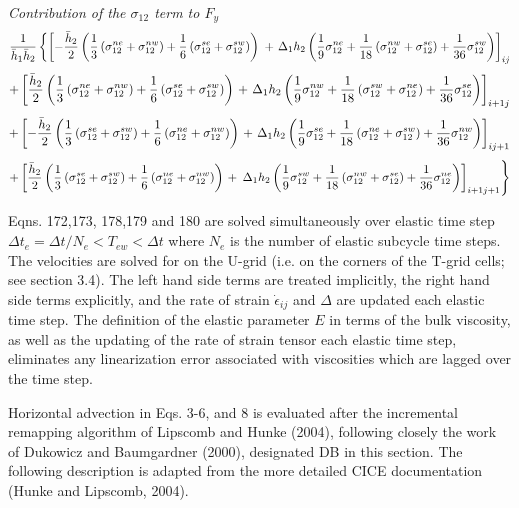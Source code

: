 {\it Contribution of the $\sigma_{12}$ term to $F_y$}
$$
{1\over \bar{h}_1\bar{h}_2}\left\{ 
\left[-{\bar{h}_2\over 2}\left( 
         {1\over 3}\left(\sigma_{12}^{ne}+\sigma_{12}^{nw}\right)  
 +{1\over
6}\left(\sigma_{12}^{se}+\sigma_{12}^{sw}\right)\right)\right.\right.
+\left.{\Delta_1h_2}\left({1\over 9}\sigma_{12}^{ne}
           +{1\over 18}\left(\sigma_{12}^{nw}+\sigma_{12}^{se}\right)
           +{1\over 36}\sigma_{12}^{sw}\right)\right]_{ij} $$
$$
+\left[{\bar{h}_2\over 2}\left( 
        {1\over 3}\left(\sigma_{12}^{ne}+\sigma_{12}^{nw}\right) 
       +{1\over
6}\left(\sigma_{12}^{se}+\sigma_{12}^{sw}\right)\right)\right.
+\left.{\Delta_1h_2}\left({1\over 9}\sigma_{12}^{nw}
           +{1\over 18}\left(\sigma_{12}^{sw}+\sigma_{12}^{ne}\right)
           +{1\over 36}\sigma_{12}^{se}\right)\right]_{i+1j} $$
$$
+\left[-{\bar{h}_2\over 2}\left( 
         {1\over 3}\left(\sigma_{12}^{se}+\sigma_{12}^{sw}\right) 
        +{1\over
6}\left(\sigma_{12}^{ne}+\sigma_{12}^{nw}\right)\right)\right.
+\left.{\Delta_1h_2}\left({1\over 9}\sigma_{12}^{se}
           +{1\over 18}\left(\sigma_{12}^{ne}+\sigma_{12}^{sw}\right)
           +{1\over 36}\sigma_{12}^{nw}\right)\right]_{ij+1} $$
$$
+\left[{\bar{h}_2\over 2}\left( 
        {1\over 3}\left(\sigma_{12}^{se}+\sigma_{12}^{sw}\right) 
       +{1\over
6}\left(\sigma_{12}^{ne}+\sigma_{12}^{nw}\right)\right)\right.
+\left.\left.{\Delta_1h_2}
      \left({1\over 9}\sigma_{12}^{sw}
           +{1\over 18}\left(\sigma_{12}^{nw}+\sigma_{12}^{se}\right)
           +{1\over 36}\sigma_{12}^{ne}\right)\right]_{i+1j+1}\right\} $$

Eqns. 172,173, 178,179 and 180 are solved simultaneously over elastic time step 
$\Delta t_e = \Delta t / N_e < T_{ew} < \Delta t$ where $N_e$ is the number of 
elastic subcycle time steps. The velocities are solved for on the U-grid (i.e.
on the corners of the T-grid cells; see section 3.4). The left hand side terms 
are treated implicitly, the right hand side terms explicitly, and the rate of strain
$\dot\epsilon_{ij}$ and $\Delta$ are updated each elastic time step. The definition of
the elastic parameter $E$ in terms of the bulk viscosity, as well as the updating of 
the rate of strain tensor each elastic time step, eliminates any linearization error
associated with viscosities which are lagged over the time step.

\vskip 8pt

Horizontal advection in Eqs. 3-6, and 8 is evaluated after the incremental 
remapping algorithm of Lipscomb and Hunke (2004), following closely the
work of Dukowicz and Baumgardner (2000), designated DB in this section. The 
following description is adapted from the more detailed CICE documentation 
(Hunke and Lipscomb, 2004).

